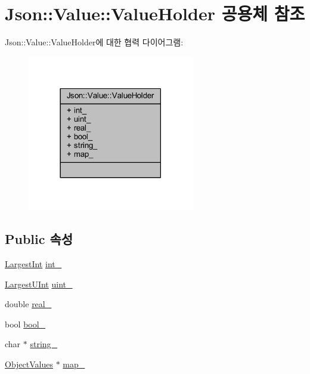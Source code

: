 \hypertarget{union_json_1_1_value_1_1_value_holder}{}\section{Json\+:\+:Value\+:\+:Value\+Holder 공용체 참조}
\label{union_json_1_1_value_1_1_value_holder}


Json\+:\+:Value\+:\+:Value\+Holder에 대한 협력 다이어그램\+:\nopagebreak
\begin{figure}[H]
\begin{center}
\leavevmode
\includegraphics[width=206pt]{union_json_1_1_value_1_1_value_holder__coll__graph}
\end{center}
\end{figure}
\subsection*{Public 속성}
\begin{DoxyCompactItemize}
\item 
\hyperlink{class_json_1_1_value_a1cbb82642ed05109b9833e49f042ece7}{Largest\+Int} \hyperlink{union_json_1_1_value_1_1_value_holder_adbfb384301298844ed955ba5cf6015a0}{int\+\_\+}
\item 
\hyperlink{class_json_1_1_value_a6682a3684d635e03fc06ba229fa24eec}{Largest\+U\+Int} \hyperlink{union_json_1_1_value_1_1_value_holder_aab65665dc15a24a29a8e93cdeeaa7e50}{uint\+\_\+}
\item 
double \hyperlink{union_json_1_1_value_1_1_value_holder_af0c5ca724e5fe3a15db773d750e2351e}{real\+\_\+}
\item 
bool \hyperlink{union_json_1_1_value_1_1_value_holder_a92edab1861dadbfefd8be5fd4285eefe}{bool\+\_\+}
\item 
char $\ast$ \hyperlink{union_json_1_1_value_1_1_value_holder_a70ac2b153bc405527baa3850d2ddc3cb}{string\+\_\+}
\item 
\hyperlink{class_json_1_1_value_a08b6c80c3af7071d908dabf044de5388}{Object\+Values} $\ast$ \hyperlink{union_json_1_1_value_1_1_value_holder_a1e7a5b86d4f52234f55c847ad1ce389a}{map\+\_\+}
\end{DoxyCompactItemize}



